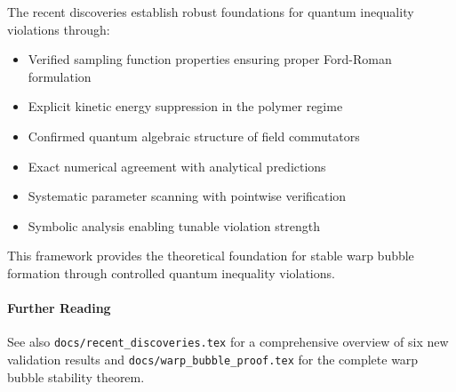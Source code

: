 \documentclass[12pt]{article}
\begin{document}
The recent discoveries establish robust foundations for quantum inequality violations through:
\begin{itemize}
\item Verified sampling function properties ensuring proper Ford-Roman formulation
\item Explicit kinetic energy suppression in the polymer regime  
\item Confirmed quantum algebraic structure of field commutators
\item Exact numerical agreement with analytical predictions
\item Systematic parameter scanning with pointwise verification
\item Symbolic analysis enabling tunable violation strength
\end{itemize}

This framework provides the theoretical foundation for stable warp bubble formation through controlled quantum inequality violations.

\paragraph{Further Reading}
See also \texttt{docs/recent\_discoveries.tex} for a comprehensive overview of six new validation results and \texttt{docs/warp\_bubble\_proof.tex} for the complete warp bubble stability theorem.
\end{document}

